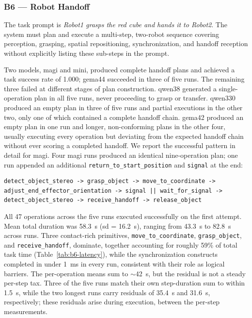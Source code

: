 \subsubsection{B6 — Robot Handoff}
The task prompt is \textit{Robot1 grasps the red cube and hands it to Robot2}. The system must plan and execute a multi-step, two-robot sequence covering perception, grasping, spatial repositioning, synchronization, and handoff reception without explicitly listing these sub-steps in the prompt.

Two models, \gls{magi} and \gls{mini}, produced complete handoff plans and achieved a task success rate of 1.000; \gls{gema44} succeeded in three of five runs. The remaining three failed at different stages of plan construction. \gls{qwen38} generated a single-operation plan in all five runs, never proceeding to grasp or transfer. \gls{qwen330} produced an empty plan in three of five runs and partial executions in the other two, only one of which contained a complete handoff chain. \gls{gema42} produced an empty plan in one run and longer, non-conforming plans in the other four, usually executing every operation but deviating from the expected handoff chain without ever scoring a completed handoff. We report the successful pattern in detail for \gls{magi}. Four \gls{magi} runs produced an identical nine-operation plan; one run appended an additional \texttt{return\_to\_start\_position} and \texttt{signal} at the end:

\begin{lstlisting}
detect_object_stereo -> grasp_object -> move_to_coordinate -> adjust_end_effector_orientation -> signal || wait_for_signal -> detect_object_stereo -> receive_handoff -> release_object
\end{lstlisting}

All 47 operations across the five runs executed successfully on the first attempt. Mean total duration was 58.3~s (\gls{sd} = 16.2~s), ranging from 43.3~s to 82.8~s across runs. Three contact-rich primitives, \texttt{move\_to\_coordinate}, \texttt{grasp\_object}, and \texttt{receive\_handoff}, dominate, together accounting for roughly 59\% of total task time (Table~\ref{tab:b6-latency}), while the synchronization constructs completed in under 1~ms in every run, consistent with their role as logical barriers. The per-operation means sum to $\sim$42~s, but the residual is not a steady per-step tax. Three of the five runs match their own step-duration sum to within 1.5~s, while the two longest runs carry residuals of 35.4~s and 31.6~s, respectively; these residuals arise during execution, between the per-step measurements.

